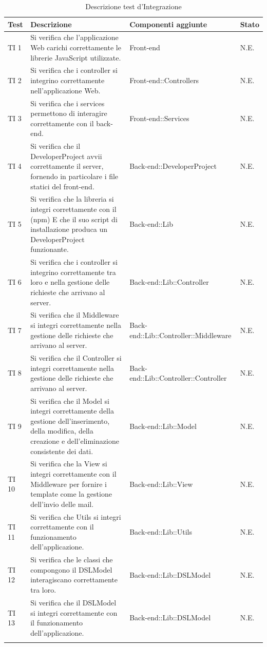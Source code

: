 	\bgroup
	\begin{longtable}[H]{|P{1cm}|P{5cm}|P{4.5cm}|P{2cm}|}
		\hline \textbf{Test} & \textbf{Descrizione} & \textbf{Componenti aggiunte} & \textbf{Stato} \\
		
		\hline TI 1 & Si verifica che l'applicazione Web carichi correttamente le librerie JavaScript utilizzate. & Front-end & N.E. \\
		\hline TI 2 & Si verifica che i controller si integrino correttamente nell'applicazione Web. & Front-end::Controllers & N.E. \\
		\hline TI 3 & Si verifica che i services permettono di interagire correttamente con il back-end. & Front-end::Services & N.E. \\
		\hline TI 4 & Si verifica che il DeveloperProject avvii correttamente il server, fornendo in particolare i file statici del front-end. & Back-end::DeveloperProject & N.E. \\
		\hline TI 5 & Si verifica che la libreria si integri correttamente con il  (npm) E che il suo script di installazione produca un DeveloperProject funzionante. & Back-end::Lib & N.E. \\
		\hline TI 6 & Si verifica che i controller si integrino correttamente tra loro e nella gestione delle richieste che arrivano al server. & Back-end::Lib::Controller & N.E. \\
		\hline TI 7 & Si verifica che il Middleware si integri correttamente nella gestione delle richieste che arrivano al server. & Back-end::Lib::Controller::Middleware & N.E. \\
		\hline TI 8 & Si verifica che il Controller si integri correttamente nella gestione delle richieste che arrivano al server. & Back-end::Lib::Controller::Controller & N.E. \\
		\hline TI 9 & Si verifica che il Model si integri correttamente della gestione dell'inserimento, della modifica, della creazione e dell'eliminazione consistente dei dati. & Back-end::Lib::Model & N.E. \\
		\hline TI 10 & Si verifica che la View si integri correttamente con il Middleware per fornire i template come la gestione dell'invio delle mail. & Back-end::Lib::View & N.E. \\
		\hline TI 11 & Si verifica che Utils si integri correttamente con il funzionamento dell'applicazione. & Back-end::Lib::Utils & N.E. \\
		\hline TI 12 & Si verifica che le classi che compongono il DSLModel interagiscano correttamente tra loro. & Back-end::Lib::DSLModel & N.E. \\
		\hline TI 13 & Si verifica che il DSLModel si integri correttamente con il funzionamento dell'applicazione. & Back-end::Lib::DSLModel & N.E. \\
		\hline

	\caption{Descrizione test d'Integrazione}
	\end{longtable}
	\egroup

